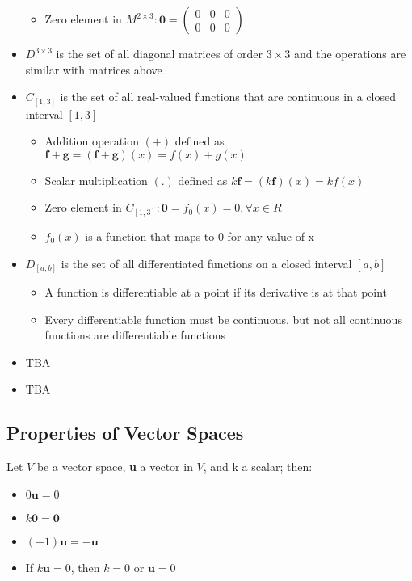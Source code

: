 \documentclass[a4paper,12pt]{article}
\begin{document}
\begin{itemize}
\begin{itemize}
          \item Zero element in \(M^{2\times 3}:\textbf{0}=\begin{pmatrix}0&0&0\\0&0&0\end{pmatrix}\)
        \end{itemize}
  \item \(D^{3\times 3}\) is the set of all diagonal matrices of order \(3\times 3\) and the operations are similar with matrices above
  \item \(C_{[1,3]}\) is the set of all real-valued functions that are continuous in a closed interval \({[1,3]}\) \begin{itemize}
          \item Addition operation \((+)\) defined as \(\textbf{f}+\textbf{g}=(\textbf{f}+\textbf{g})(x)=f(x)+g(x)\)
          \item Scalar multiplication \((.)\) defined as \(k\textbf{f}=(k\textbf{f})(x)=kf(x)\)
          \item Zero element in \(C_{[1,3]}: \textbf{0}=f_0(x)=0, \forall x\in R\)
          \item[] \(f_0(x)\) is a function that maps to 0 for any value of x
        \end{itemize}
  \item \(D_{[a,b]}\) is the set of all differentiated functions on a closed interval \({[a,b]}\) \begin{itemize}
          \item A function is differentiable at a point if its derivative is at that point
          \item Every differentiable function must be continuous, but not all continuous functions are differentiable functions
        \end{itemize}
  \item TBA
  \item TBA
\end{itemize}

\subsection*{Properties of Vector Spaces}
Let \(V\) be a vector space, \textbf{u} a vector in \(V\), and k a scalar; then: \begin{itemize}
  \item \(0\textbf{u}=0\)
  \item \(k\textbf{0}=\textbf{0}\)
  \item \((-1)\textbf{u}=-\textbf{u}\)
  \item If \(k\textbf{u}=0\), then \(k=0\) or \(\textbf{u}=0\)
\end{itemize}
\end{document}
